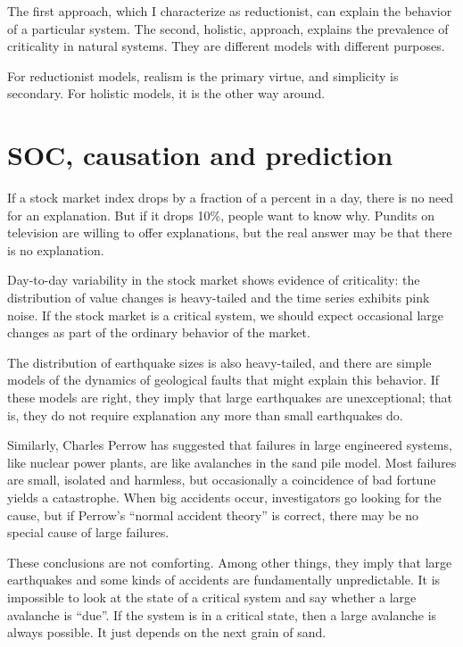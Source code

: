 \documentclass[12pt]{book}
\theoremstyle{exercise}
\begin{document}
The first approach, which I characterize as reductionist, can explain
the behavior of a particular system.  The second, holistic, approach,
explains the prevalence of criticality in natural systems.  They are
different models with different purposes.


For reductionist models, realism is the primary virtue, and simplicity
is secondary.  For holistic models, it is the other way around.


\section{SOC, causation and prediction}

If a stock market index drops by a fraction of a percent in a
day, there is no need for an explanation.  But if it drops 10\%,
people want to know why.  Pundits
on television are willing to offer explanations, but the real
answer may be that there is no explanation.


Day-to-day variability in the stock market shows evidence of
criticality: the distribution of value changes is heavy-tailed
and the time series exhibits pink noise.
If the stock market is a critical system, we
should expect occasional large changes as part of the ordinary
behavior of the market.

The distribution of earthquake sizes is also heavy-tailed,
and there are simple models of the dynamics of geological faults
that might explain this behavior.  If these models are right,
they imply that large earthquakes are unexceptional; that is,
they do not require explanation any more than
small earthquakes do.


Similarly, Charles Perrow has suggested that failures in large
engineered systems, like nuclear power plants, are like avalanches
in the sand pile model.  Most failures are small, isolated and
harmless, but occasionally a coincidence of bad fortune yields a
catastrophe.  When big accidents occur, investigators go looking for
the cause, but if Perrow's ``normal accident theory'' is correct,
there may be no special cause of large failures.


These conclusions are not comforting.  Among other things, they
imply that large earthquakes and some kinds of accidents are
fundamentally unpredictable.  It is impossible to look at the
state of a critical system and say whether a large avalanche
is ``due''.  If the system is in a critical state, then a large
avalanche is always possible.  It just depends on the
next grain of sand.
\end{document}
